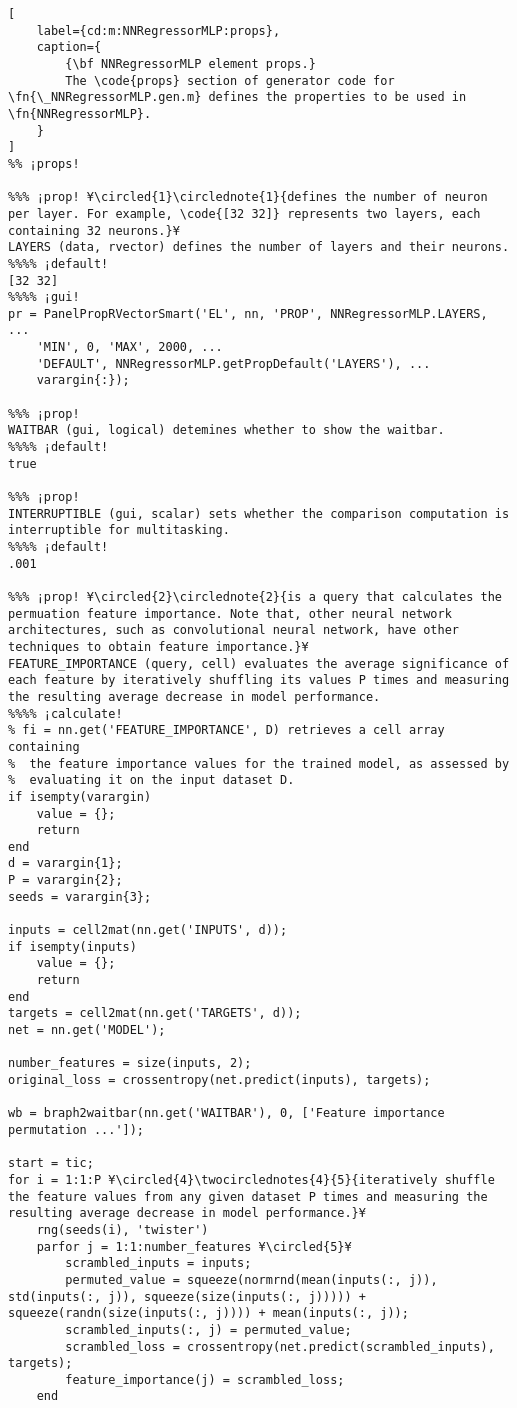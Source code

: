 \documentclass{tufte-handout}
\begin{document}
\begin{lstlisting}[
	label={cd:m:NNRegressorMLP:props},
	caption={
		{\bf NNRegressorMLP element props.}
		The \code{props} section of generator code for \fn{\_NNRegressorMLP.gen.m} defines the properties to be used in \fn{NNRegressorMLP}.
	}
]
%% ¡props!

%%% ¡prop! ¥\circled{1}\circlednote{1}{defines the number of neuron per layer. For example, \code{[32 32]} represents two layers, each containing 32 neurons.}¥
LAYERS (data, rvector) defines the number of layers and their neurons.
%%%% ¡default!
[32 32]
%%%% ¡gui!
pr = PanelPropRVectorSmart('EL', nn, 'PROP', NNRegressorMLP.LAYERS, ...
    'MIN', 0, 'MAX', 2000, ...
    'DEFAULT', NNRegressorMLP.getPropDefault('LAYERS'), ...
    varargin{:});

%%% ¡prop!
WAITBAR (gui, logical) detemines whether to show the waitbar.
%%%% ¡default!
true

%%% ¡prop!
INTERRUPTIBLE (gui, scalar) sets whether the comparison computation is interruptible for multitasking.
%%%% ¡default!
.001

%%% ¡prop! ¥\circled{2}\circlednote{2}{is a query that calculates the permuation feature importance. Note that, other neural network architectures, such as convolutional neural network, have other techniques to obtain feature importance.}¥
FEATURE_IMPORTANCE (query, cell) evaluates the average significance of each feature by iteratively shuffling its values P times and measuring the resulting average decrease in model performance.
%%%% ¡calculate!
% fi = nn.get('FEATURE_IMPORTANCE', D) retrieves a cell array containing
%  the feature importance values for the trained model, as assessed by
%  evaluating it on the input dataset D.
if isempty(varargin)
    value = {};
    return
end
d = varargin{1};
P = varargin{2};
seeds = varargin{3};

inputs = cell2mat(nn.get('INPUTS', d));
if isempty(inputs)
    value = {};
    return
end
targets = cell2mat(nn.get('TARGETS', d));
net = nn.get('MODEL');

number_features = size(inputs, 2);
original_loss = crossentropy(net.predict(inputs), targets);

wb = braph2waitbar(nn.get('WAITBAR'), 0, ['Feature importance permutation ...']);

start = tic;
for i = 1:1:P ¥\circled{4}\twocirclednotes{4}{5}{iteratively shuffle the feature values from any given dataset P times and measuring the resulting average decrease in model performance.}¥
    rng(seeds(i), 'twister')
    parfor j = 1:1:number_features ¥\circled{5}¥
        scrambled_inputs = inputs;
        permuted_value = squeeze(normrnd(mean(inputs(:, j)), std(inputs(:, j)), squeeze(size(inputs(:, j))))) + squeeze(randn(size(inputs(:, j)))) + mean(inputs(:, j));
        scrambled_inputs(:, j) = permuted_value;
        scrambled_loss = crossentropy(net.predict(scrambled_inputs), targets);
        feature_importance(j) = scrambled_loss;
    end


\end{lstlisting}
\end{document}
